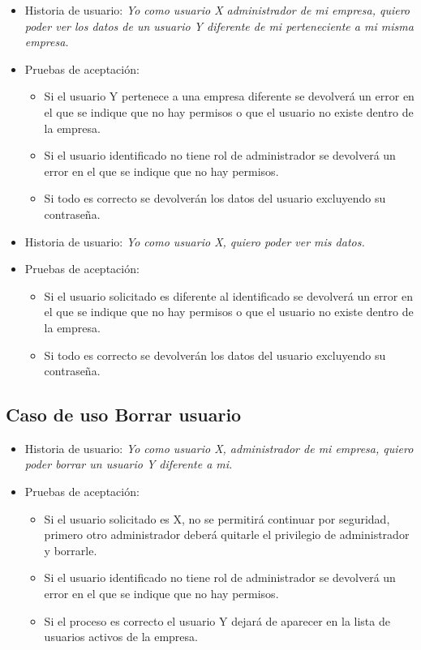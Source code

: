\documentclass[12pt,a4paperpaper,]{report}
\providecommand{\tightlist}{%
  \setlength{\itemsep}{0pt}\setlength{\parskip}{0pt}}
\begin{document}
\begin{itemize}
\tightlist
\item
  Historia de usuario: \emph{Yo como usuario X administrador de mi
  empresa, quiero poder ver los datos de un usuario Y diferente de mi
  perteneciente a mi misma empresa.}
\item
  Pruebas de aceptación:

  \begin{itemize}
  \tightlist
  \item
    Si el usuario Y pertenece a una empresa diferente se devolverá un
    error en el que se indique que no hay permisos o que el usuario no
    existe dentro de la empresa.
  \item
    Si el usuario identificado no tiene rol de administrador se
    devolverá un error en el que se indique que no hay permisos.
  \item
    Si todo es correcto se devolverán los datos del usuario excluyendo
    su contraseña.
  \end{itemize}
\item
  Historia de usuario: \emph{Yo como usuario X, quiero poder ver mis
  datos.}
\item
  Pruebas de aceptación:

  \begin{itemize}
  \tightlist
  \item
    Si el usuario solicitado es diferente al identificado se devolverá
    un error en el que se indique que no hay permisos o que el usuario
    no existe dentro de la empresa.
  \item
    Si todo es correcto se devolverán los datos del usuario excluyendo
    su contraseña.
  \end{itemize}
\end{itemize}

\subsection{Caso de uso Borrar
usuario}\label{caso-de-uso-borrar-usuario-1}

\begin{itemize}
\tightlist
\item
  Historia de usuario: \emph{Yo como usuario X, administrador de mi
  empresa, quiero poder borrar un usuario Y diferente a mi.}
\item
  Pruebas de aceptación:

  \begin{itemize}
  \tightlist
  \item
    Si el usuario solicitado es X, no se permitirá continuar por
    seguridad, primero otro administrador deberá quitarle el privilegio
    de administrador y borrarle.
  \item
    Si el usuario identificado no tiene rol de administrador se
    devolverá un error en el que se indique que no hay permisos.
  \item
    Si el proceso es correcto el usuario Y dejará de aparecer en la
    lista de usuarios activos de la empresa.
  \end{itemize}
\end{itemize}
\end{document}

